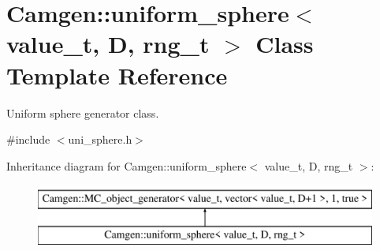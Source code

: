 \hypertarget{a00549}{\section{Camgen\-:\-:uniform\-\_\-sphere$<$ value\-\_\-t, D, rng\-\_\-t $>$ Class Template Reference}
\label{a00549}
}


Uniform sphere generator class.  




{\ttfamily \#include $<$uni\-\_\-sphere.\-h$>$}

Inheritance diagram for Camgen\-:\-:uniform\-\_\-sphere$<$ value\-\_\-t, D, rng\-\_\-t $>$\-:\begin{figure}[H]
\begin{center}
\leavevmode
\includegraphics[height=2.000000cm]{a00549}
\end{center}
\end{figure}
